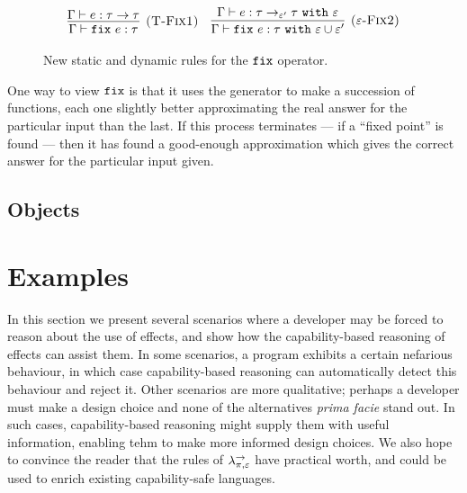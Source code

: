 \begin{figure}[h]

 \\
 \\

\[
\begin{array}{c}

\infer[\textsc{(T-Fix1)}]
	{\Gamma \vdash \fix{e} : \tau}
	{\Gamma \vdash e: \tau \rightarrow \tau}
~~~
\infer[\textsc{($\varepsilon$-Fix2)}]
	{\Gamma \vdash \fix{e}: \tau~\kw{with} \varepsilon \cup \varepsilon' }
	{\Gamma \vdash e: \tau \rightarrow_{\varepsilon'} \tau ~\kw{with} \varepsilon }
\end{array}
\]

\vspace{-12pt}
\caption{New static and dynamic rules for the $\mathtt{fix}$ operator.}
\label{A sample. }
\end{figure}

One way to view $\mathtt{fix}$ is that it uses the generator to make a succession of functions, each one slightly better approximating the real answer for the particular input than the last. If this process terminates --- if a ``fixed point'' is found --- then it has found a good-enough approximation which gives the correct answer for the particular input given.


\subsection{Objects}


\section{Examples}

In this section we present several scenarios where a developer may be forced to reason about the use of effects, and show how the capability-based reasoning of effects can assist them. In some scenarios, a program exhibits a certain nefarious behaviour, in which case capability-based reasoning can automatically detect this behaviour and reject it. Other scenarios are more qualitative; perhaps a developer must make a design choice and none of the alternatives \textit{prima facie} stand out. In such cases, capability-based reasoning might supply them with useful information, enabling tehm to make more informed design choices. We also hope to convince the reader that the rules of $\lambda^{\rightarrow}_{\pi, \varepsilon}$ have practical worth, and could be used to enrich existing capability-safe languages.

